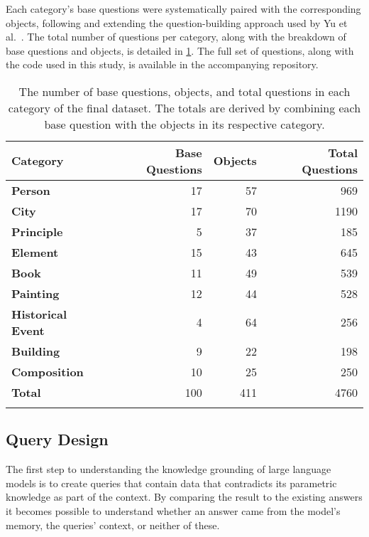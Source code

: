 Each category's base questions were systematically paired with the corresponding objects, following and extending the question-building approach used by Yu et al.~\cite{factual_recall}.
The total number of questions per category, along with the breakdown of base questions and objects, is detailed in \cref{category_amounts}.
The full set of questions, along with the code used in this study, is available in the accompanying repository.

\begin{table}[t]
	\centering
	\footnotesize
	\begin{tabular}{>{\bfseries}l r r r}
		\toprule
			\bfseries Category & \bfseries Base Questions & \bfseries Objects & \bfseries Total Questions \\
		\midrule
			Person & 17 & 57 & 969 \\
			City & 17 & 70 & 1190 \\
			Principle & 5 & 37 & 185 \\
			Element & 15 & 43 & 645 \\
			Book & 11 & 49 & 539 \\
			Painting & 12 & 44 & 528 \\
			Historical Event & 4 & 64 & 256 \\
			Building & 9 & 22 & 198 \\
			Composition & 10 & 25 & 250 \\
		\midrule
			Total & 100 & 411 & 4760 \\
		\bottomrule \addlinespace[4pt]
	\end{tabular}
	\caption{The number of base questions, objects, and total questions in each category of the final dataset. The totals are derived by combining each base question with the objects in its respective category.}
	\label{category_amounts}
\end{table}



\subsection{Query Design}
\label{query_design}

The first step to understanding the knowledge grounding of large language models is to create queries that contain data that contradicts its parametric knowledge as part of the context.
By comparing the result to the existing answers it becomes possible to understand whether an answer came from the model's memory, the queries' context, or neither of these.

